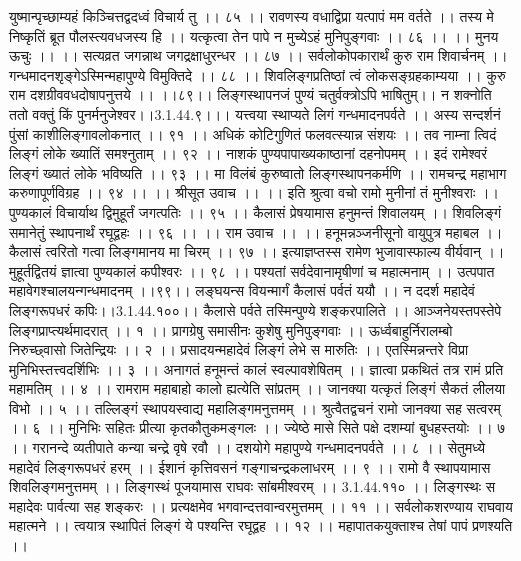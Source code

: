 युष्मान्पृच्छाम्यहं किञ्चित्तद्वदध्वं विचार्य तु ।। ८५ ।।
रावणस्य वधाद्विप्रा यत्पापं मम वर्तते ।।
तस्य मे निष्कृतिं ब्रूत पौलस्त्यवधजस्य हि ।।
यत्कृत्वा तेन पापे न मुच्येऽहं मुनिपुङ्गवाः ।। ८६ ।।
।। मुनय ऊचुः ।। ।।
सत्यव्रत जगन्नाथ जगद्रक्षाधुरन्धर ।। ८७ ।।
सर्वलोकोपकारार्थं कुरु राम शिवार्चनम् ।।
गन्धमादनशृङ्गेऽस्मिन्महापुण्ये विमुक्तिदे ।। ८८ ।।
शिवलिङ्गप्रतिष्ठां त्वं लोकसङ्ग्रहकाम्यया ।।
कुरु राम दशग्रीववधदोषापनुत्तये ।। ।।८९।।
लिङ्गस्थापनजं पुण्यं चतुर्वक्त्रोऽपि भाषितुम्।।
न शक्नोति ततो वक्तुं किं पुनर्मनुजेश्वर।।3.1.44.९।।।
यत्त्वया स्थाप्यते लिगं गन्धमादनपर्वते ।।
अस्य सन्दर्शनं पुंसां काशीलिङ्गावलोकनात् ।। ९१ ।।
अधिकं कोटिगुणितं फलवत्स्यान्न संशयः ।।
तव नाम्ना त्विदं लिङ्गं लोके ख्यातिं समश्नुताम् ।। ९२ ।।
नाशकं पुण्यपापाख्यकाष्ठानां दहनोपमम् ।।
इदं रामेश्वरं लिङ्गं ख्यातं लोके भविष्यति ।। ९३ ।।
मा विलंबं कुरुष्वातो लिङ्गस्थापनकर्मणि ।।
रामचन्द्र महाभाग करुणापूर्णविग्रह ।। ९४ ।।
।। श्रीसूत उवाच ।। ।।
इति श्रुत्वा वचो रामो मुनीनां तं मुनीश्वराः ।।
पुण्यकालं विचार्याथ द्विमुहूर्तं जगत्पतिः ।। ९५ ।।
कैलासं प्रेषयामास हनुमन्तं शिवालयम् ।।
शिवलिङ्गं समानेतुं स्थापनार्थं रघूद्वहः ।। ९६ ।।
।। राम उवाच ।। ।।
हनूमन्नञ्जनीसूनो वायुपुत्र महाबल ।।
कैलासं त्वरितो गत्वा लिङ्गमानय मा चिरम् ।। ९७ ।।
इत्याज्ञप्तस्स रामेण भुजावास्फाल्य वीर्यवान् ।।
मुहूर्तद्वितयं ज्ञात्वा पुण्यकालं कपीश्वरः ।। ९८ ।।
पश्यतां सर्वदेवानामृषीणां च महात्मनाम् ।।
उत्पपात महावेगश्चालयन्गन्धमादनम् ।।९९।।
लङ्घयन्स वियन्मार्गं कैलासं पर्वतं ययौ ।।
न ददर्श महादेवं लिङ्गरूपधरं कपिः।।3.1.44.१००।।
कैलासे पर्वते तस्मिन्पुण्ये शङ्करपालिते ।।
आञ्जनेयस्तपस्तेपे लिङ्गप्राप्त्यर्थमादरात् ।। १ ।।
प्रागग्रेषु समासीनः कुशेषु मुनिपुङ्गवाः ।।
ऊर्ध्वबाहुर्निरालम्बो निरुच्छ्वासो जितेन्द्रियः ।। २ ।।
प्रसादयन्महादेवं लिङ्गं लेभे स मारुतिः ।।
एतस्मिन्नन्तरे विप्रा मुनिभिस्तत्त्वदर्शिभिः ।। ३ ।।
अनागतं हनूमन्तं कालं स्वल्पावशेषितम् ।।
ज्ञात्वा प्रकथितं तत्र रामं प्रति महामतिम् ।। ४ ।।
रामराम महाबाहो कालो ह्यत्येति सांप्रतम् ।।
जानक्या यत्कृतं लिङ्गं सैकतं लीलया विभो ।। ५ ।।
तल्लिङ्गं स्थापयस्वाद्य महालिङ्गमनुत्तमम् ।।
श्रुत्वैतद्वचनं रामो जानक्या सह सत्वरम् ।। ६ ।।
मुनिभिः सहितः प्रीत्या कृतकौतुकमङ्गलः ।।
ज्येष्ठे मासे सिते पक्षे दशम्यां बुधहस्तयोः ।। ७ ।।
गरानन्दे व्यतीपाते कन्या चन्द्रे वृषे रवौ ।।
दशयोगे महापुण्ये गन्धमादनपर्वते ।। ८ ।।
सेतुमध्ये महादेवं लिङ्गरूपधरं हरम् ।।
ईशानं कृत्तिवसनं गङ्गाचन्द्रकलाधरम् ।। ९ ।।
रामो वै स्थापयामास शिवलिङ्गमनुत्तमम् ।।
लिङ्गस्थं पूजयामास राघवः सांबमीश्वरम् ।। 3.1.44.११० ।।
लिङ्गस्थः स महादेवः पार्वत्या सह शङ्करः ।।
प्रत्यक्षमेव भगवान्दत्तवान्वरमुत्तमम् ।। ११ ।।
सर्वलोकशरण्याय राघवाय महात्मने ।।
त्वयात्र स्थापितं लिङ्गं ये पश्यन्ति रघूद्वह ।। १२ ।।
महापातकयुक्ताश्च तेषां पापं प्रणश्यति ।।
